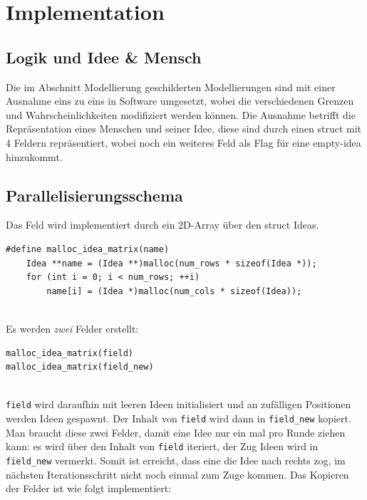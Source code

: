 \section{Implementation}
\subsection{Logik und Idee \& Mensch}
Die im Abschnitt Modellierung geschilderten Modellierungen sind mit einer Ausnahme eins zu eins in Software umgesetzt, wobei die verschiedenen Grenzen und Wahrscheinlichkeiten modifiziert werden können. Die Ausnahme betrifft die Repräsentation eines Menschen und seiner Idee, diese sind durch einen struct mit 4 Feldern repräsentiert, wobei noch ein weiteres Feld als Flag für eine empty-idea hinzukommt.

\subsection{Parallelisierungsschema}

Das Feld wird implementiert durch ein 2D-Array über den struct Ideas.

\begin{verbatim}
#define malloc_idea_matrix(name)                              
    Idea **name = (Idea **)malloc(num_rows * sizeof(Idea *)); 
    for (int i = 0; i < num_rows; ++i)                        
        name[i] = (Idea *)malloc(num_cols * sizeof(Idea)); 
\end{verbatim}
\quad \\
Es werden \textit{zwei} Felder erstellt:

\begin{verbatim}
malloc_idea_matrix(field)
malloc_idea_matrix(field_new)
\end{verbatim}
\quad \\
\texttt{field} wird daraufhin mit leeren Ideen initialisiert und an zufälligen Positionen werden Ideen gespawnt. 
Der Inhalt von \texttt{field} wird dann in \texttt{field\_new} kopiert. 
Man braucht diese zwei Felder, damit eine Idee nur ein mal pro Runde ziehen kann: 
es wird über den Inhalt von \texttt{field} iteriert, der Zug Ideen wird in \texttt{field\_new} vermerkt. 
Somit ist erreicht, dass eine die Idee nach rechts zog, im nächsten Iterationsschritt nicht noch einmal zum Zuge kommen. 
Das Kopieren der Felder ist wie folgt implementiert:

